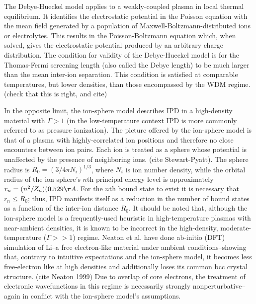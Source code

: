 \documentclass [11pt, proquest, article] {uwthesis}[2016/11/22]
\begin{document}
The Debye-Hueckel model applies to a weakly-coupled plasma in local thermal equilibrium. It identifies the electrostatic potential in the Poisson equation with the mean field generated by a population of Maxwell-Boltzmann-distributed ions or electrolytes. This results in the Poisson-Boltzmann equation which, when solved, gives the electrostatic potential produced by an arbitrary charge distribution. The condition for validity of the Debye-Hueckel model is for the Thomas-Fermi screening length (also called the Debye length) to be much larger than the mean inter-ion separation. This condition is satisfied at comparable temperatures, but lower densities, than those encompassed by the WDM regime. (check that this is right, and cite)

In the opposite limit, the ion-sphere model describes IPD in a high-density material with $\Gamma > 1$ (in the low-temperature context IPD is more commonly referred to as pressure ionization). The picture offered by the ion-sphere model is that of a plasma with highly-correlated ion positions and therefore no close encounters between ion pairs. Each ion is treated as a sphere whose potential is unaffected by the presence of neighboring ions. (cite Stewart-Pyatt). The sphere radius is $R_0 = (3/4 \pi N_i)^{1/3}$, where $N_i$ is ion number density, while the orbital radius of the ion sphere's $n$th principal energy level is approximately $r_n = (n^2/Z_n)(0.529 \AA$. For the $n$th bound state to exist it is necessary that $r_n \leq R_0$; thus, IPD manifests itself as a reduction in the number of bound states as a function of the inter-ion distance $R_0$. It should be noted that, although the ion-sphere model is a frequently-used heuristic in high-temperature plasmas with near-ambient densities, it is known to be incorrect in the high-density, moderate-temperature ($\Gamma >> 1$) regime. Neaton et al. have done ab-initio (DFT) simulation of Li--a free electron-like material under ambient conditions--showing that, contrary to intuitive expectations and the ion-sphere model, it becomes less free-electron like at high densities and additionally loses its common bcc crystal structure. (cite Neaton 1999) Due to overlap of core electrons, the treatment of electronic wavefunctions in this regime is necessarily strongly nonperturbative--again in conflict with the ion-sphere model's assumptions. 
\end{document}
